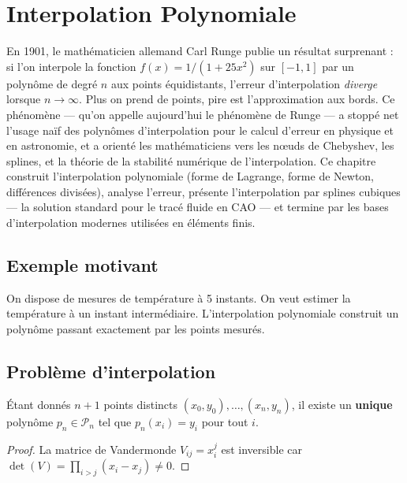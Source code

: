 \chapter{Interpolation Polynomiale}
\label{ch:interpolation}

En 1901, le mathématicien allemand Carl Runge publie un résultat surprenant : si l'on interpole la fonction $f(x) = 1/(1+25x^2)$ sur $[-1,1]$ par un polynôme de degré $n$ aux points équidistants, l'erreur d'interpolation \emph{diverge} lorsque $n \to \infty$. Plus on prend de points, pire est l'approximation aux bords. Ce phénomène --- qu'on appelle aujourd'hui le phénomène de Runge --- a stoppé net l'usage naïf des polynômes d'interpolation pour le calcul d'erreur en physique et en astronomie, et a orienté les mathématiciens vers les nœuds de Chebyshev, les splines, et la théorie de la stabilité numérique de l'interpolation. Ce chapitre construit l'interpolation polynomiale (forme de Lagrange, forme de Newton, différences divisées), analyse l'erreur, présente l'interpolation par splines cubiques --- la solution standard pour le tracé fluide en CAO --- et termine par les bases d'interpolation modernes utilisées en éléments finis.

\section{Exemple motivant}
On dispose de mesures de temp\'erature \`a 5 instants. On veut estimer la temp\'erature \`a un instant interm\'ediaire. L'interpolation polynomiale construit un polyn\^ome passant exactement par les points mesur\'es.

\section{Probl\`eme d'interpolation}

\begin{theoreme}
\'Etant donn\'es $n+1$ points distincts $(x_0,y_0),\ldots,(x_n,y_n)$, il existe un \textbf{unique} polyn\^ome $p_n\in\mathcal{P}_n$ tel que $p_n(x_i)=y_i$ pour tout $i$.
\end{theoreme}

\begin{proof}
La matrice de Vandermonde $V_{ij}=x_i^j$ est inversible car $\det(V)=\prod_{i>j}(x_i-x_j)\neq 0$.
\end{proof}

